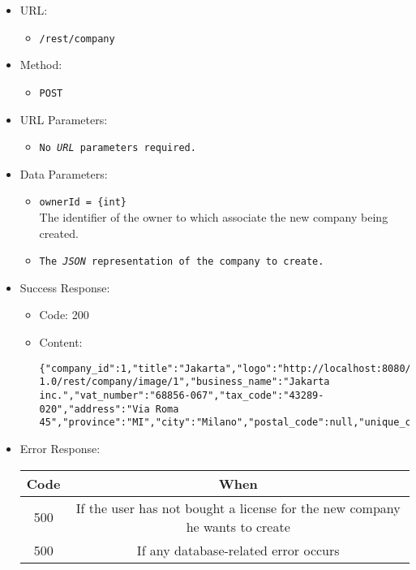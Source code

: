 \begin{itemize}

    \item URL:
    \begin{itemize}
        \item \texttt{/rest/company}
    \end{itemize}

    \item Method:
    \begin{itemize}
        \item \texttt{POST}
    \end{itemize}

    \item URL Parameters:
    \begin{itemize}
        \item \texttt{No \textit{URL} parameters required.}
    \end{itemize}

    \item Data Parameters:
    \begin{itemize}
        \item \texttt{ownerId = \{int\}} \\
        The identifier of the owner to which associate the new company being created.
        \item \texttt{The \textit{JSON} representation of the company to create.}
    \end{itemize}

    \item Success Response:
    \begin{itemize}
        \item Code: 200
        \item Content:
        \begin{lstlisting}
{"company_id":1,"title":"Jakarta","logo":"http://localhost:8080/bitsei-1.0/rest/company/image/1","business_name":"Jakarta inc.","vat_number":"68856-067","tax_code":"43289-020","address":"Via Roma 45","province":"MI","city":"Milano","postal_code":null,"unique_code":"1","has_mail_notifications":false,"has_telegram_notifications":false}
        \end{lstlisting}
    \end{itemize}

    \item Error Response:
    \begin{table}[!h]
    \centering
    \begin{tabular}{|c|c|}
    \hline
    \multicolumn{1}{|c|}{\textbf{Code}} & \multicolumn{1}{c|}{\textbf{When}} \\ \hline
    500 & If the user has not bought a license for the new company he wants to create \\\hline
    500 & If any database-related error occurs \\\hline
    \end{tabular}
    \end{table}

\end{itemize}


